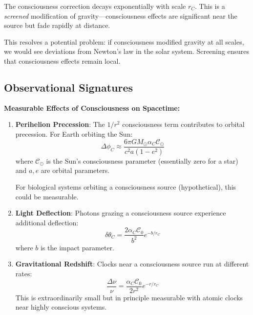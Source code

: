 \begin{keyidea}
The consciousness correction decays exponentially with scale $r_C$. This is a \textit{screened} modification of gravity---consciousness effects are significant near the source but fade rapidly at distance.

This resolves a potential problem: if consciousness modified gravity at all scales, we would see deviations from Newton's law in the solar system. Screening ensures that consciousness effects remain local.
\end{keyidea}

\subsection{Observational Signatures}

\begin{level2}
\textbf{Measurable Effects of Consciousness on Spacetime:}

\begin{enumerate}
\item \textbf{Perihelion Precession}: The $1/r^2$ consciousness term contributes to orbital precession. For Earth orbiting the Sun:
\begin{equation}
\Delta \phi_C \approx \frac{6\pi G M_\odot \alpha_C \mathcal{C}_\odot}{c^2 a (1-e^2)}
\end{equation}
where $\mathcal{C}_\odot$ is the Sun's consciousness parameter (essentially zero for a star) and $a, e$ are orbital parameters.

For biological systems orbiting a consciousness source (hypothetical), this could be measurable.

\item \textbf{Light Deflection}: Photons grazing a consciousness source experience additional deflection:
\begin{equation}
\delta\theta_C = \frac{2\alpha_C \mathcal{C}_0}{b^2} e^{-b/r_C}
\end{equation}
where $b$ is the impact parameter.

\item \textbf{Gravitational Redshift}: Clocks near a consciousness source run at different rates:
\begin{equation}
\frac{\Delta \nu}{\nu} = \frac{\alpha_C \mathcal{C}_0}{2r^2} e^{-r/r_C}
\end{equation}
This is extraordinarily small but in principle measurable with atomic clocks near highly conscious systems.
\end{enumerate}
\end{level2}


